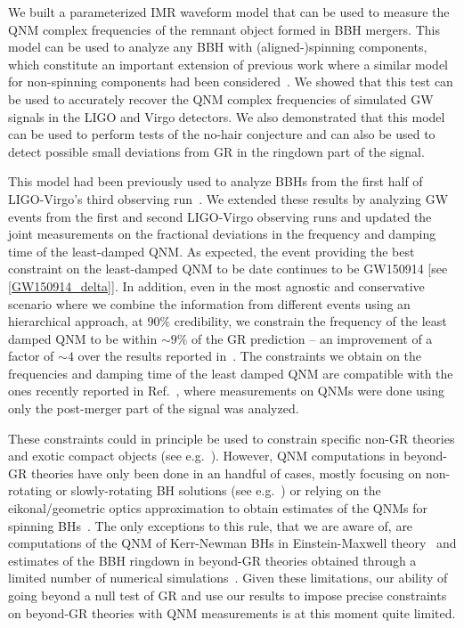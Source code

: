 We built a parameterized IMR waveform model that can be used to measure the QNM complex frequencies of the remnant object formed in BBH mergers. This model can be used to analyze any BBH with (aligned-)spinning components, which constitute an important extension of previous work where a similar model for non-spinning components had been considered~\cite{Brito:2018rfr}. We showed that this test can be used to accurately recover the QNM complex frequencies of simulated GW signals in the LIGO and Virgo detectors. We also demonstrated that this model can be used to perform tests of the no-hair conjecture and can also be used to detect possible small deviations from GR in the ringdown part of the signal.

This model had been previously used to analyze BBHs from the first half of LIGO-Virgo's third observing run~\cite{Abbott:2020jks}. We extended these results by analyzing GW events from the first and second LIGO-Virgo observing runs and updated the joint measurements on the fractional deviations in the frequency and damping time of the least-damped QNM. As expected, the event providing the best constraint on the least-damped QNM to be date continues to be GW150914 [see \eqref{GW150914_delta}]. In addition, even in the most agnostic and conservative scenario where we combine the information from different events using an hierarchical approach, at $90\%$ credibility, we constrain the frequency of the least damped QNM to be within $\sim 9\%$ of the GR prediction -- an improvement of a factor of $\sim 4$ over the results reported in~\cite{Abbott:2020jks}. The constraints we obtain on the frequencies and damping time of the least damped QNM are compatible with the ones recently reported in Ref.~\cite{Carullo:2021dui}, where measurements on QNMs were done using only the post-merger part of the signal was analyzed.

These constraints could in principle be used to constrain specific non-GR theories and exotic compact objects (see e.g.~\cite{Glampedakis:2017cgd,Cardoso:2019rvt,Maggio:2020jml}). However, QNM computations in beyond-GR theories have only been done in an handful of cases, mostly focusing on non-rotating or slowly-rotating BH solutions (see e.g.~\cite{Ferrari:2000ep,Molina:2010fb,Pani:2009wy,Blazquez-Salcedo:2016enn,Blazquez-Salcedo:2017txk,Brito:2018hjh,Franciolini:2018uyq,Cardoso:2018ptl,Tattersall:2018nve,Tattersall:2019nmh,Blazquez-Salcedo:2019nwd,Silva:2019scu,Glampedakis:2019dqh,Blazquez-Salcedo:2020jee,Blazquez-Salcedo:2020caw,Cano:2020cao}) or relying on the eikonal/geometric optics approximation to obtain estimates of the QNMs for spinning BHs~\cite{Blazquez-Salcedo:2016enn,Glampedakis:2017dvb,Jai-akson:2017ldo}. The only exceptions to this rule, that we are aware of, are computations of the QNM of Kerr-Newman BHs in Einstein-Maxwell theory~\cite{Pani:2013ija,Pani:2013wsa,Mark:2014aja,Dias:2015wqa} and estimates of the BBH ringdown in beyond-GR theories obtained through a limited number of numerical simulations~\cite{Okounkova:2019dfo,Okounkova:2019zjf}. Given these limitations, our ability of going beyond a  null test of GR and use our results to impose precise constraints on beyond-GR theories with QNM measurements is at this moment quite limited.


